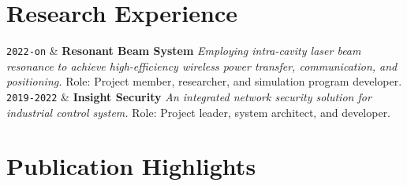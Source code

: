 \documentclass[9pt,a4paper]{article}
\newcommand{\Duration}[2]{\fontsize{10pt}{0}\selectfont \texttt{#1-#2}}
\newcommand{\Ongoing}{on}
\newcommand{\Website}[1]{\href{https://#1}{#1}}
\begin{document}
\section{Research Experience}

\begin{EntriesTableDuration}
  \Duration{2022}{\Ongoing} &
  \textbf{Resonant Beam System} %
  \newline
  \textit{Employing intra-cavity laser beam resonance to achieve high-efficiency wireless power transfer, communication, and positioning.}
  \newline
  Role: Project member, researcher, and simulation program developer.
  \\
  \Duration{2019}{2022} &
  \textbf{Insight Security}
  \newline
  \textit{An integrated network security solution for industrial control system.}
  \newline
  Role: Project leader, system architect, and developer.
  \\

  
\end{EntriesTableDuration}


\section{Publication Highlights}
\end{document}
